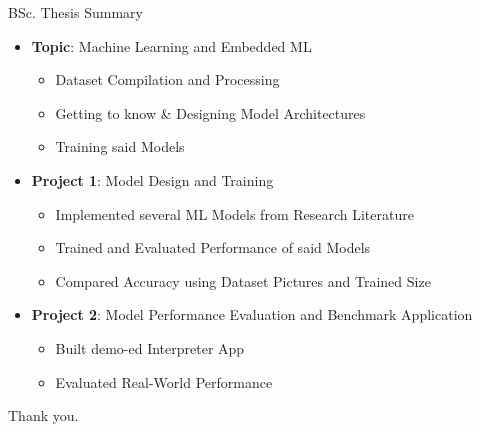 \documentclass{beamer}
\begin{document}
\begin{frame}{BSc. Thesis Summary}
    \begin{itemize}
        \item \textbf{Topic}: Machine Learning and Embedded ML
        \begin{itemize}
            \item Dataset Compilation and Processing
            \item Getting to know \& Designing Model Architectures
            \item Training said Models
        \end{itemize}
        \item \textbf{Project 1}: Model Design and Training
        \begin{itemize}
            \item Implemented several ML Models from Research Literature
            \item Trained and Evaluated Performance of said Models
            \item Compared Accuracy using Dataset Pictures and Trained Size
        \end{itemize}
        \item \textbf{Project 2}: Model Performance Evaluation and Benchmark Application
        \begin{itemize}
            \item Built demo-ed Interpreter App 
            \item Evaluated Real-World Performance
        \end{itemize}
    \end{itemize}

    \hspace{}
    \centering
    \item Thank you.
    \centering
\end{frame}
\end{document}
